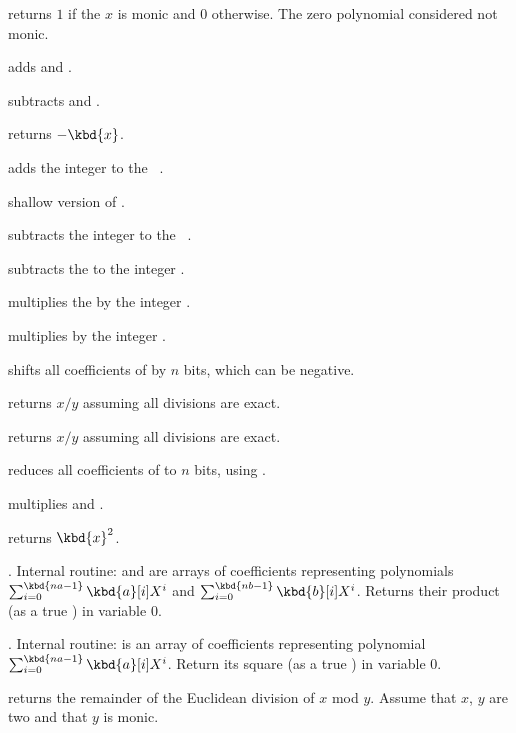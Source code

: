  returns $1$ if the  $x$ is monic and $0$
otherwise.  The zero polynomial considered not monic.

 adds  and .

 subtracts  and .

 returns $-\kbd{x}$.

 adds the integer  to the
~.

 shallow version of .

 subtracts the integer  to the
~.

 subtracts the   to the
integer .

 multiplies the   by the
integer .

 multiplies  by the integer .

 shifts all coefficients of  by $n$
bits, which can be negative.

 returns $x/y$ assuming all divisions
are exact.

 returns $x/y$ assuming all divisions
are exact.

 reduces all coefficients of  to
$n$ bits, using .

 multiplies  and .

 returns $\kbd{x}^2$.

. Internal routine:
 and  are arrays of coefficients representing polynomials
$\sum_{i = 0}^{\kbd{na-1}} \kbd{a}[i] X^i$ and
$\sum_{i = 0}^{\kbd{nb-1}} \kbd{b}[i] X^i$. Returns their product (as a true
) in variable $0$.

. Internal routine:
 is an array of coefficients representing polynomial
$\sum_{i = 0}^{\kbd{na-1}} \kbd{a}[i] X^i$. Return its square (as a true
) in variable $0$.

 returns the remainder of the Euclidean
division of $x$ mod $y$. Assume that $x$, $y$ are two  and that
$y$ is monic.

